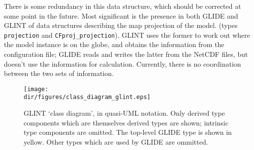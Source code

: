 There is some redundancy in this data structure, which should be corrected at
some point in the future. Most significant is the presence in both GLIDE and
GLINT of data structures describing the map projection of the model. (types
\texttt{projection} and \texttt{CFproj\_projection}). GLINT uses the former to
work out where the model instance is on the globe, and obtains the information
from the configuration file; GLIDE reads and writes the latter from the NetCDF
files, but doesn't use the information for calculation. Currently, there is no
coordination between the two sets of information. 
%
\begin{figure}[htbp]
\centering
\texttt{[image: \\dir/figures/class\_diagram\_glint.eps]}
\caption{GLINT `class diagram', in quasi-UML notation. Only derived type components which
  are themselves derived types are shown; intrinsic type components are
  omitted. The top-level GLIDE type is shown in yellow. Other types
  which are used by GLIDE are ommitted.}
\label{dg.fig.glint_class_diagram}
\end{figure}

